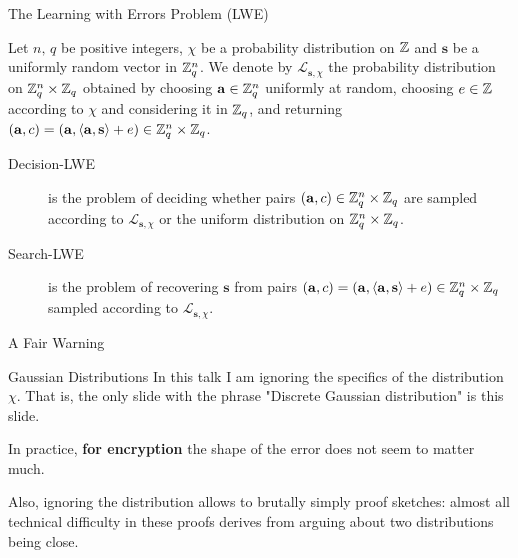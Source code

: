 \documentclass[xcolor=table,10pt,aspectratio=169]{beamer}
\newcommand{\Ldis}{\ensuremath{\mathcal{L}_{\mathbf{s},\chi}}\xspace}
\renewcommand{\vec}[1]{\ensuremath{\mathbf{#1}}\xspace}
\begin{document}
\begin{frame}[label={sec:orge1a672a}]{The Learning with Errors Problem (LWE)}
\begin{definition}
Let \(n,\,q\) be positive integers, \(\chi\) be a probability distribution on \(\mathbb{Z}\) and \(\vec{s}\) be a uniformly random vector in \(\mathbb{Z}_q^n\). We denote by \(\Ldis\) the probability distribution on \(\mathbb{Z}_q^n \times \mathbb{Z}_q\) obtained by choosing \(\vec{a} \in \ZZ_q^n\) uniformly at random, choosing \(e \in \mathbb{Z}\) according to \(\chi\) and considering it in \(\mathbb{Z}_q\), and returning  \((\vec{a},c) = (\vec{a},\langle \vec{a},\vec{s} \rangle+ e) \in \ZZ_q^n \times \ZZ_q\).

\begin{description}
\item[{Decision-LWE}] is the problem of deciding whether pairs \((\vec{a}, c) \in \ZZ_q^n \times \ZZ_q\) are sampled according to \(\Ldis\) or the uniform distribution on \(\mathbb{Z}_q^n \times \mathbb{Z}_q\).

\item[{Search-LWE}] is the problem of recovering \(\vec{s}\) from pairs \((\vec{a}, c)=(\vec{a},\langle  \vec{a},\vec{s}\rangle + e) \in \ZZ_q^n \times \ZZ_q\) sampled according to \(\Ldis\).
\end{description}
\end{definition}

\end{frame}

\begin{frame}[label={sec:orgc0c94a2}]{A Fair Warning}
\begin{alertblock}{Gaussian Distributions}
In this talk I am ignoring the specifics of the distribution \(\chi\). That is, the only slide with the phrase "Discrete Gaussian distribution" is this slide.

In practice, \textbf{for encryption} the shape of the error does not seem to matter much.

Also, ignoring the distribution allows to brutally simply proof sketches: almost all technical difficulty in these proofs derives from arguing about two distributions being close.
\end{alertblock}
\end{frame}
\end{document}
